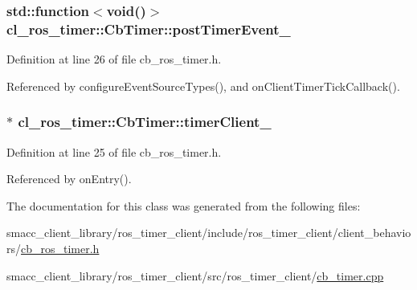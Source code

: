 \subsubsection[{\texorpdfstring{post\+Timer\+Event\+\_\+}{postTimerEvent_}}]{\setlength{\rightskip}{0pt plus 5cm}std\+::function$<$void()$>$ cl\+\_\+ros\+\_\+timer\+::\+Cb\+Timer\+::post\+Timer\+Event\+\_\+\hspace{0.3cm}{\ttfamily [private]}}\hypertarget{classcl__ros__timer_1_1CbTimer_ad2b7913a84459d635fdcca8d346c7af2}{}\label{classcl__ros__timer_1_1CbTimer_ad2b7913a84459d635fdcca8d346c7af2}


Definition at line 26 of file cb\+\_\+ros\+\_\+timer.\+h.



Referenced by configure\+Event\+Source\+Types(), and on\+Client\+Timer\+Tick\+Callback().

\subsubsection[{\texorpdfstring{timer\+Client\+\_\+}{timerClient_}}]{$\ast$ cl\+\_\+ros\+\_\+timer\+::\+Cb\+Timer\+::timer\+Client\+\_\+\hspace{0.3cm}{\ttfamily [private]}}\hypertarget{classcl__ros__timer_1_1CbTimer_aefff167dbfbc54485f700a2c6b2479a5}{}\label{classcl__ros__timer_1_1CbTimer_aefff167dbfbc54485f700a2c6b2479a5}


Definition at line 25 of file cb\+\_\+ros\+\_\+timer.\+h.



Referenced by on\+Entry().



The documentation for this class was generated from the following files\+:\begin{DoxyCompactItemize}
\item 
smacc\+\_\+client\+\_\+library/ros\+\_\+timer\+\_\+client/include/ros\+\_\+timer\+\_\+client/client\+\_\+behaviors/\hyperlink{cb__ros__timer_8h}{cb\+\_\+ros\+\_\+timer.\+h}\item 
smacc\+\_\+client\+\_\+library/ros\+\_\+timer\+\_\+client/src/ros\+\_\+timer\+\_\+client/\hyperlink{cb__timer_8cpp}{cb\+\_\+timer.\+cpp}\end{DoxyCompactItemize}

